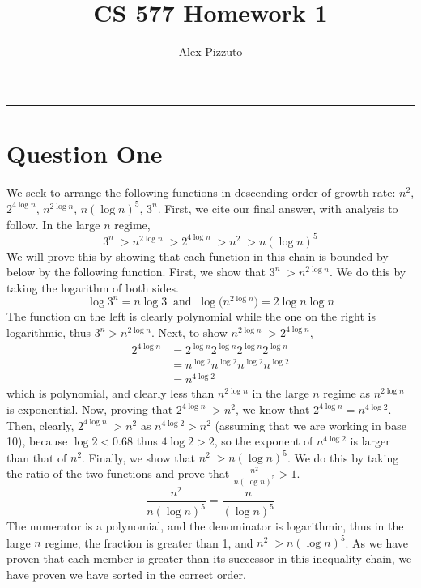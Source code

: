 \documentclass[11pt,letterpaper]{article}
\author{Alex Pizzuto}
\title{CS 577 Homework 1}
\begin{document}
\date{}
\maketitle
\hrule

\section*{Question One}
We seek to arrange the following functions in descending order of growth rate: $n^2$, $2^{4\log n}$, $n^{2\log n}$, $n(\log n)^5$, $3^n$. First, we cite our final answer, with analysis to follow. In the large $n$ regime, 
\begin{equation*}
	3^n \; > n^{2\log n} \; > 2^{4\log n} \; > n^2 \; > n(\log n)^5
\end{equation*}
We will prove this by showing that each function in this chain is bounded by below by the following function. First, we show that $3^n \; > n^{2\log n}$. We do this by taking the logarithm of both sides.
\begin{equation*}
	\log 3^n = n \log 3 \;\; \mbox{and} \;\; \log \Big( n^{2\log n}\Big) = 2\log n\log n
\end{equation*}
The function on the left is clearly polynomial while the one on the right is logarithmic, thus $3^n > n^{2\log n}$. Next, to show $n^{2\log n} \; > 2^{4\log n}$, 
\begin{align*}
	2^{4\log n} &= 2^{\log n}2^{\log n}2^{\log n}2^{\log n} \\
	&= n^{\log 2} n^{\log 2} n^{\log 2} n^{\log 2} \\
	&= n^{4 \log 2}
\end{align*}
which is polynomial, and clearly less than $n^{2\log n}$ in the large $n$ regime as $n^{2\log n}$ is exponential. Now, proving that $2^{4\log n} \; > n^2$, we know that $2^{4\log n} = n^{4 \log 2}$. Then, clearly, $2^{4\log n} \; > n^2$ as $n^{4 \log 2} > n^2$ (assuming that we are working in base 10), because $\log 2 < 0.68$ thus $4 \log 2 > 2$, so the exponent of $n^{4 \log 2}$ is larger than that of $n^2$. Finally, we show that $n^2 \; > n(\log n)^5$. We do this by taking the ratio of the two functions and prove that $\frac{n^2}{n(\log n)^5} > 1$.
\begin{equation*}
	\frac{n^2}{n(\log n)^5} = \frac{n}{(\log n)^5}
\end{equation*}
The numerator is a polynomial, and the denominator is logarithmic, thus in the large $n$ regime, the fraction is greater than 1, and $n^2 \; > n(\log n)^5$. As we have proven that each member is greater than its successor in this inequality chain, we have proven we have sorted in the correct order. 
\end{document}
